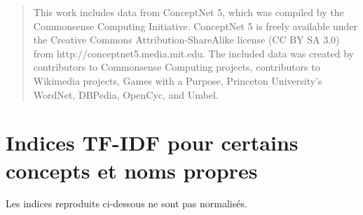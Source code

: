 \documentclass[a4paper, 12pt]{article}
\begin{document}
\begin{quotation}
 This work includes data from ConceptNet 5, which was compiled by the Commonsense Computing Initiative. ConceptNet 5 is freely available under the Creative Commons Attribution-ShareAlike license (CC BY SA 3.0) from http://conceptnet5.media.mit.edu. The included data was created by contributors to Commonsense Computing projects, contributors to Wikimedia projects, Games with a Purpose, Princeton University's WordNet, DBPedia, OpenCyc, and Umbel.
\end{quotation}

\nocite{*}
\printbibliography{}

\newpage
\appendix

\section{Indices TF-IDF pour certains concepts et noms propres}

Les indices reproduits ci-dessous ne sont pas normalisés.
\end{document}
